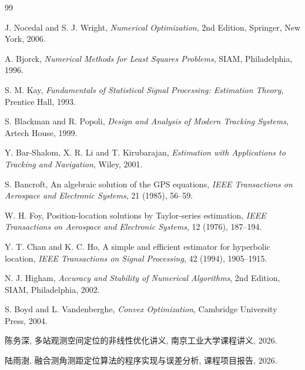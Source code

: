 \documentclass[openany]{./MathematicalModelCaseStudyReport}
\numberwithin{algorithm}{chapter}
\begin{document}
\backmatter
\linespread{1.1}\selectfont
\begin{thebibliography}{99}
\thispagestyle{plain}

\newblock J. Nocedal and S. J. Wright,
\newblock \emph{Numerical Optimization}, 2nd Edition,
\newblock Springer, New York, 2006.

\newblock A. Bjorck,
\newblock \emph{Numerical Methods for Least Squares Problems},
\newblock SIAM, Philadelphia, 1996.

\newblock S. M. Kay,
\newblock \emph{Fundamentals of Statistical Signal Processing: Estimation Theory},
\newblock Prentice Hall, 1993.

\newblock S. Blackman and R. Popoli,
\newblock \emph{Design and Analysis of Modern Tracking Systems},
\newblock Artech House, 1999.

\newblock Y. Bar-Shalom, X. R. Li and T. Kirubarajan,
\newblock \emph{Estimation with Applications to Tracking and Navigation},
\newblock Wiley, 2001.

\newblock S. Bancroft,
\newblock An algebraic solution of the GPS equations,
\newblock \emph{IEEE Transactions on Aerospace and Electronic Systems}, 21 (1985), 56--59.

\newblock W. H. Foy,
\newblock Position-location solutions by Taylor-series estimation,
\newblock \emph{IEEE Transactions on Aerospace and Electronic Systems}, 12 (1976), 187--194.

\newblock Y. T. Chan and K. C. Ho,
\newblock A simple and efficient estimator for hyperbolic location,
\newblock \emph{IEEE Transactions on Signal Processing}, 42 (1994), 1905--1915.

\newblock N. J. Higham,
\newblock \emph{Accuracy and Stability of Numerical Algorithms}, 2nd Edition,
\newblock SIAM, Philadelphia, 2002.

\newblock S. Boyd and L. Vandenberghe,
\newblock \emph{Convex Optimization},
\newblock Cambridge University Press, 2004.

\newblock 陈务深,
\newblock 多站观测空间定位的非线性优化讲义,
\newblock 南京工业大学课程讲义, 2026.

\newblock 陆雨澍,
\newblock 融合测角测距定位算法的程序实现与误差分析,
\newblock 课程项目报告, 2026.

\end{thebibliography}
\end{document}
